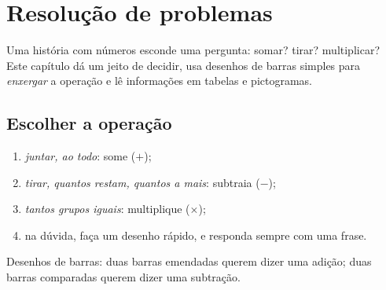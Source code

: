 \chapter{Resolução de problemas}\label{ch:g2:problems}

Uma história com números esconde uma pergunta: somar? tirar?
multiplicar? Este capítulo dá um jeito de decidir, usa desenhos de
barras simples para \emph{enxergar} a operação e lê informações em
tabelas e pictogramas.

\section{Escolher a operação}

\begin{method}\label{met:g2:problems:choose}
\begin{enumerate}
  \item \emph{juntar, ao todo}: some ($+$);
  \item \emph{tirar, quantos restam, quantos a mais}: subtraia
        ($-$);
  \item \emph{tantos grupos iguais}: multiplique ($\times$);
  \item na dúvida, faça um desenho rápido, e responda sempre com uma
        frase.
\end{enumerate}
\end{method}

\begin{omfigure}

{\small Desenhos de barras: duas barras emendadas querem dizer uma
adição; duas barras comparadas querem dizer uma subtração.}
\end{omfigure}

